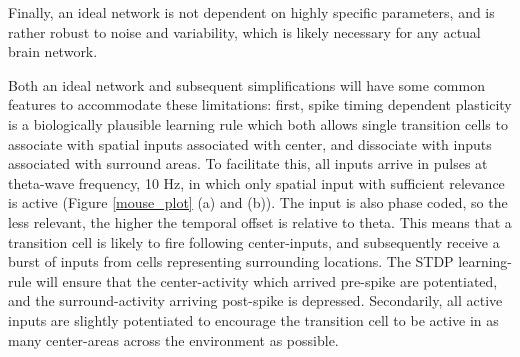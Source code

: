 \documentclass{article}
\begin{document}
    Finally, an ideal network is not dependent on highly specific parameters, and is rather robust to noise and variability, which is likely necessary for any actual brain network.

    Both an ideal network and subsequent simplifications will have some common features to accommodate these limitations: first, spike timing dependent plasticity is a biologically plausible learning rule which both allows single transition cells to associate with spatial inputs associated with center, and dissociate with inputs associated with surround areas. To facilitate this, all inputs arrive in pulses at theta-wave frequency, 10 Hz, in which only spatial input with sufficient relevance is active (Figure \ref{mouse_plot} (a) and (b)). The input is also phase coded, so the less relevant, the higher the temporal offset is relative to theta. This means that a transition cell is likely to fire following center-inputs, and subsequently receive a burst of inputs from cells representing surrounding locations. The STDP learning-rule will ensure that the center-activity which arrived pre-spike are potentiated, and the surround-activity arriving post-spike is depressed. Secondarily, all active inputs are slightly potentiated to encourage the transition cell to be active in as many center-areas across the environment as possible.
\end{document}
